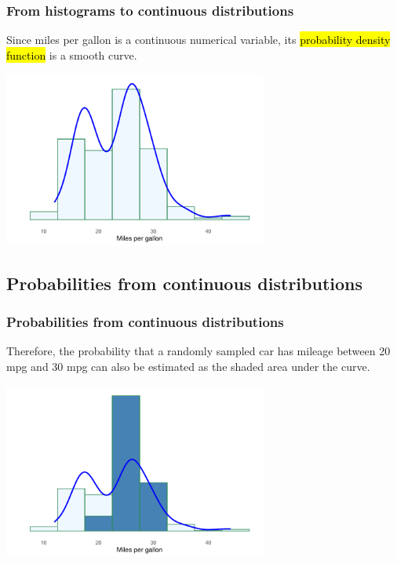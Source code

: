 \documentclass[notes,11pt, aspectratio=169]{beamer}
\begin{document}
\begin{frame}
\frametitle{From histograms to continuous distributions}

Since miles per gallon is a continuous numerical variable, its \hl{probability density function} is a smooth curve.

\begin{center}
\includegraphics[width=0.65\textwidth]{graphs/l03f04}
\end{center}

\end{frame}


\subsection{Probabilities from continuous distributions}

\begin{frame}
\frametitle{Probabilities from continuous distributions}

Therefore, the probability that a randomly sampled car has mileage between 20 mpg and 30 mpg can also be estimated as the shaded area under the curve.

\begin{center}
\includegraphics[width=0.65\textwidth]{graphs/l03f05}
\end{center}


\end{frame}
\end{document}
